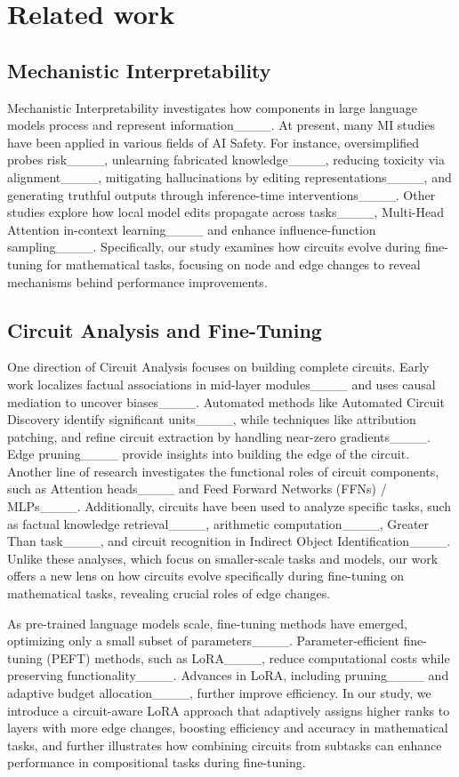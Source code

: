 \section{Related work}
\subsection{Mechanistic Interpretability}
Mechanistic Interpretability investigates how components in large language models process and represent information____.
At present, many MI studies have been applied in various fields of AI Safety. For instance, oversimplified probes risk____, unlearning fabricated knowledge____, reducing toxicity via alignment____, mitigating hallucinations by editing representations____, and generating truthful outputs through inference-time interventions____. Other studies explore how local model edits propagate across tasks____, Multi-Head Attention in-context learning____ and enhance influence-function sampling____. Specifically, our study examines how circuits evolve during fine-tuning for mathematical tasks, focusing on node and edge changes to reveal mechanisms behind performance improvements.

\subsection{Circuit Analysis and Fine-Tuning}
One direction of Circuit Analysis focuses on building complete circuits. Early work localizes factual associations in mid-layer modules____ and uses causal mediation to uncover biases____. Automated methods like Automated Circuit Discovery identify significant units____, while techniques like attribution patching, and refine circuit extraction by handling near-zero gradients____. Edge pruning____ provide insights into building the edge of the circuit. Another line of research investigates the functional roles of circuit components, such as Attention heads____ and Feed Forward Networks (FFNs) / MLPs____. 
Additionally, circuits have been used to analyze specific tasks, such as factual knowledge retrieval____, arithmetic computation____, Greater Than task____, and circuit recognition in Indirect Object Identification____. Unlike these analyses, which focus on smaller-scale tasks and models, our work offers a new lens on how circuits evolve specifically during fine-tuning on mathematical tasks, revealing crucial roles of edge changes.

As pre-trained language models scale, fine-tuning methods have emerged, optimizing only a small subset of parameters____. Parameter-efficient fine-tuning (PEFT) methods, such as LoRA____, reduce computational costs while preserving functionality____. Advances in LoRA, including pruning____ and adaptive budget allocation____, further improve efficiency. In our study, we introduce a circuit-aware LoRA approach that adaptively assigns higher ranks to layers with more edge changes, boosting efficiency and accuracy in mathematical tasks, and further illustrates how combining circuits from subtasks can enhance performance in compositional tasks during fine-tuning.